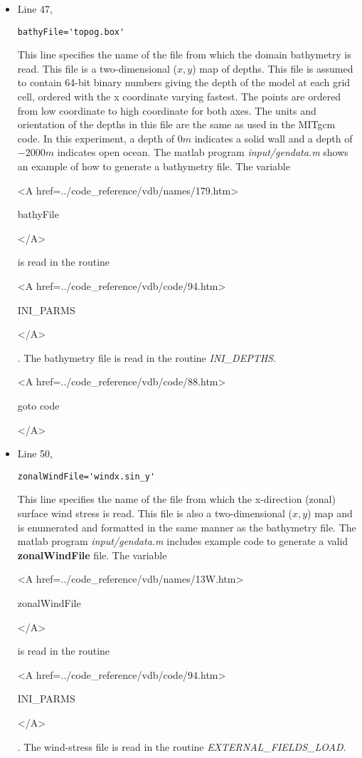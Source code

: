 \begin{itemize}
\item Line 47,
\begin{verbatim}
bathyFile='topog.box'
\end{verbatim}
This line specifies the name of the file from which the domain
bathymetry is read. This file is a two-dimensional ($x,y$) map of
depths. This file is assumed to contain 64-bit binary numbers 
giving the depth of the model at each grid cell, ordered with the x 
coordinate varying fastest. The points are ordered from low coordinate
to high coordinate for both axes. The units and orientation of the
depths in this file are the same as used in the MITgcm code. In this
experiment, a depth of $0m$ indicates a solid wall and a depth
of $-2000m$ indicates open ocean. The matlab program
{\it input/gendata.m} shows an example of how to generate a
bathymetry file.
The variable
{\bf
\begin{rawhtml} <A href=../code_reference/vdb/names/179.htm> \end{rawhtml}
bathyFile
\begin{rawhtml} </A>\end{rawhtml}
}
is read in the routine
{\it
\begin{rawhtml} <A href=../code_reference/vdb/code/94.htm> \end{rawhtml}
INI\_PARMS
\begin{rawhtml} </A>\end{rawhtml}
}. The bathymetry file is read in the routine {\it INI\_DEPTHS}.

{\bf
\begin{rawhtml} <A href=../code_reference/vdb/code/88.htm> \end{rawhtml}
goto code
\begin{rawhtml} </A>\end{rawhtml}
}


\item Line 50,
\begin{verbatim}
zonalWindFile='windx.sin_y'
\end{verbatim}
This line specifies the name of the file from which the x-direction
(zonal) surface wind stress is read. This file is also a two-dimensional
($x,y$) map and is enumerated and formatted in the same manner as the 
bathymetry file. The matlab program {\it input/gendata.m} includes example 
code to generate a valid 
{\bf zonalWindFile} 
file.  
The variable
{\bf
\begin{rawhtml} <A href=../code_reference/vdb/names/13W.htm> \end{rawhtml}
zonalWindFile
\begin{rawhtml} </A>\end{rawhtml}
}
is read in the routine
{\it
\begin{rawhtml} <A href=../code_reference/vdb/code/94.htm> \end{rawhtml}
INI\_PARMS
\begin{rawhtml} </A>\end{rawhtml}
}.  The wind-stress file is read in the routine 
{\it EXTERNAL\_FIELDS\_LOAD}.


\end{itemize}

